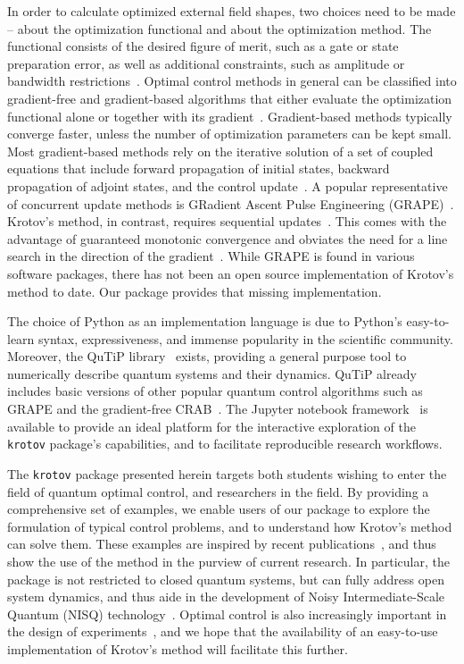 \documentclass[submission, Phys]{SciPost}
\begin{document}
In order to calculate optimized external field shapes, two choices need to be
made -- about the optimization functional and about the optimization method.
The functional consists of the desired figure of merit, such as a gate or state
preparation error, as well as additional constraints, such as amplitude or
bandwidth restrictions~\cite{GlaserEPJD2015,KochJPCM16}.
Optimal control methods in general can be classified into gradient-free and
gradient-based algorithms that either evaluate the optimization functional alone
or together with its gradient~\cite{GlaserEPJD2015}.
Gradient-based methods typically converge faster, unless the number of
optimization parameters can be kept small.
Most gradient-based methods rely on the iterative solution of a set of coupled
equations that include forward propagation of initial states, backward
propagation of adjoint states, and the control update~\cite{GlaserEPJD2015}.
A popular representative of concurrent update methods is GRadient Ascent Pulse
Engineering (GRAPE)~\cite{KhanejaJMR05}.
Krotov's method, in contrast, requires sequential
updates~\cite{Tannor92,ReichJCP12}.
This comes with the advantage of guaranteed monotonic convergence and obviates
the need for a line search in the direction of the gradient~\cite{EitanPRA11}.
While GRAPE is found in various software packages, there has not been an open
source implementation of Krotov's method to date.
Our package provides that missing implementation.

The choice of Python as an implementation language is due to Python's
easy-to-learn syntax, expressiveness, and immense popularity in the scientific
community.
Moreover, the QuTiP library~\cite{JohanssonCPC2012, JohanssonCPC2013}  exists,
providing a general purpose tool to numerically describe quantum systems and
their dynamics.
QuTiP already includes basic versions of other popular quantum control
algorithms such as GRAPE and the gradient-free CRAB~\cite{CanevaPRA11}.
The Jupyter notebook framework~\cite{Jupyter} is available to provide an ideal
platform for the interactive exploration of the \texttt{krotov} package's
capabilities, and to facilitate reproducible research workflows.

The \texttt{krotov} package presented herein targets both students wishing to
enter the field of quantum optimal control, and researchers in the field.
By providing a comprehensive set of examples, we enable users of our package to
explore the formulation of typical control problems, and to understand how
Krotov's method can solve them.
These examples are inspired by recent
publications~\cite{MullerQIP11,GoerzPRA2014,GoerzNJP2014,WattsPRA2015,
GoerzPRA2015,BasilewitschNJP2017}, and thus show the use of the method in the
purview of current research.
In particular, the package is not restricted to closed quantum systems, but can
fully address open system dynamics, and thus aide in the development of Noisy
Intermediate-Scale Quantum (NISQ) technology~\cite{PreskillQ2018}.
Optimal control is also increasingly important in the design of
experiments~\cite{GlaserEPJD2015,LovecchioPRA16,vanFrankSciRep16,OfekNat16,SorensenNat16,HeeresNatComm17,HeckPNAS18,FengPRA18,OmranS2019,Larrouy},
and we hope that the availability of an easy-to-use implementation of Krotov's
method will facilitate this further.
\end{document}
